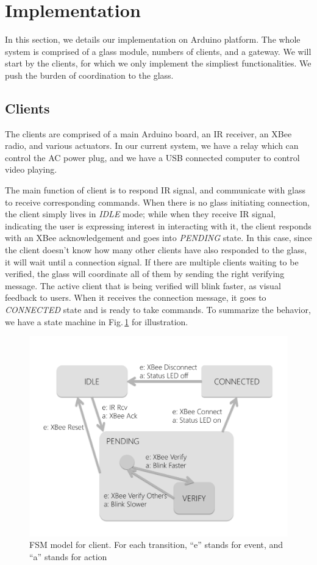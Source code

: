 
\section{Implementation}
\label{sec:implementation}

In this section, we details our implementation on Arduino \cite{Arduino} platform. The whole system is comprised of a glass module, numbers of clients, and a gateway. We will start by the clients, for which we only implement the simpliest functionalities. We push the burden of coordination to the glass.

\subsection{Clients}
The clients are comprised of a main Arduino board, an IR receiver, an XBee radio, and various actuators. In our current system, we have a relay which can control the AC power plug, and we have a USB connected computer to control video playing. 

The main function of client is to respond IR signal, and communicate with glass to receive corresponding commands. When there is no glass initiating connection, the client simply lives in {\it IDLE} mode; while when they receive IR signal, indicating the user is expressing interest in interacting with it, the client responds with an XBee acknowledgement and goes into {\it PENDING} state. In this case, since the client doesn't know how many other clients have also responded to the glass, it will wait until a connection signal. If there are multiple clients waiting to be verified, the glass will coordinate all of them by sending the right verifying message. The active client that is being verified will blink faster, as visual feedback to users. When it receives the connection message, it goes to {\it CONNECTED} state and is ready to take commands. To summarize the behavior, we have a state machine in Fig.\,\ref{fig:clientFSM} for illustration. 

\begin{figure}
  \centering
  \includegraphics[width=\linewidth]{../figs/clientFSM.pdf}
  \caption{FSM model for client. For each transition, ``e'' stands for event, and ``a'' stands for action}
  \label{fig:clientFSM}
\end{figure}

